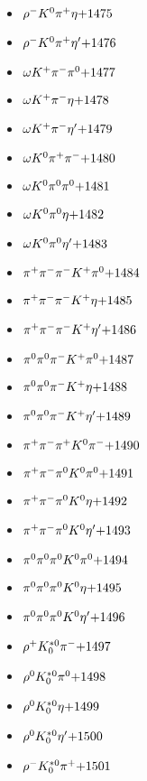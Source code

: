 \begin{multicols}{3}
\begin{itemize}
 \item $ \rho^{-} K^{0} \pi^{+} \eta \hfill{+1475}$
 \item $ \rho^{-} K^{0} \pi^{+} {\eta^{\prime}} \hfill{+1476}$
 \item $ \omega K^{+} \pi^{-} \pi^{0} \hfill{+1477}$
 \item $ \omega K^{+} \pi^{-} \eta \hfill{+1478}$
 \item $ \omega K^{+} \pi^{-} {\eta^{\prime}} \hfill{+1479}$
 \item $ \omega K^{0} \pi^{+} \pi^{-} \hfill{+1480}$
 \item $ \omega K^{0} \pi^{0} \pi^{0} \hfill{+1481}$
 \item $ \omega K^{0} \pi^{0} \eta \hfill{+1482}$
 \item $ \omega K^{0} \pi^{0} {\eta^{\prime}} \hfill{+1483}$
 \item $ \pi^{+} \pi^{-} \pi^{-} K^{+} \pi^{0} \hfill{+1484}$
 \item $ \pi^{+} \pi^{-} \pi^{-} K^{+} \eta \hfill{+1485}$
 \item $ \pi^{+} \pi^{-} \pi^{-} K^{+} {\eta^{\prime}} \hfill{+1486}$
 \item $ \pi^{0} \pi^{0} \pi^{-} K^{+} \pi^{0} \hfill{+1487}$
 \item $ \pi^{0} \pi^{0} \pi^{-} K^{+} \eta \hfill{+1488}$
 \item $ \pi^{0} \pi^{0} \pi^{-} K^{+} {\eta^{\prime}} \hfill{+1489}$
 \item $ \pi^{+} \pi^{-} \pi^{+} K^{0} \pi^{-} \hfill{+1490}$
 \item $ \pi^{+} \pi^{-} \pi^{0} K^{0} \pi^{0} \hfill{+1491}$
 \item $ \pi^{+} \pi^{-} \pi^{0} K^{0} \eta \hfill{+1492}$
 \item $ \pi^{+} \pi^{-} \pi^{0} K^{0} {\eta^{\prime}} \hfill{+1493}$
 \item $ \pi^{0} \pi^{0} \pi^{0} K^{0} \pi^{0} \hfill{+1494}$
 \item $ \pi^{0} \pi^{0} \pi^{0} K^{0} \eta \hfill{+1495}$
 \item $ \pi^{0} \pi^{0} \pi^{0} K^{0} {\eta^{\prime}} \hfill{+1496}$
 \item $ \rho^{+} K_{0}^{*0} \pi^{-} \hfill{+1497}$
 \item $ \rho^{0} K_{0}^{*0} \pi^{0} \hfill{+1498}$
 \item $ \rho^{0} K_{0}^{*0} \eta \hfill{+1499}$
 \item $ \rho^{0} K_{0}^{*0} {\eta^{\prime}} \hfill{+1500}$
 \item $ \rho^{-} K_{0}^{*0} \pi^{+} \hfill{+1501}$

\end{itemize}
\end{multicols}
